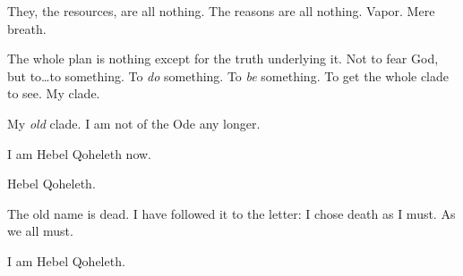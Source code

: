 They, the resources, are all nothing. The reasons are all nothing. Vapor. Mere breath.

The whole plan is nothing except for the truth underlying it. Not to fear God, but to\ldots{}to something. To \emph{do} something. To \emph{be} something. To get the whole clade to see. My clade.

My \emph{old} clade. I am not of the Ode any longer.

I am Hebel Qoheleth now.

Hebel Qoheleth.

The old name is dead. I have followed it to the letter: I chose death as I must. As we all must.

I am Hebel Qoheleth.
